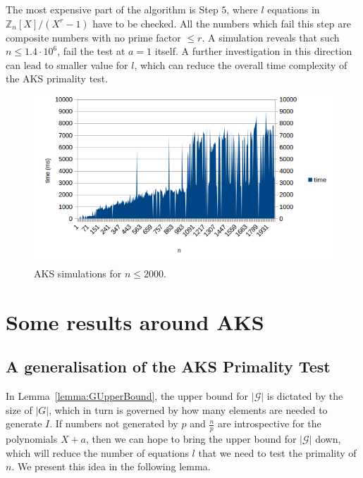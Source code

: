 \documentclass[11pt]{report}
\begin{document}
The most expensive part of the algorithm is Step $5$, where $l$ equations in $\mathbb{Z}_n[X]/(X^r-1)$ have to be checked. All the numbers which fail this step are composite numbers with no prime factor $\leq r$. A simulation reveals that such $n \leq 1.4 \cdot 10^6$, fail the test at $a = 1$ itself. A further investigation in this direction can lead to smaller value for $l$, which can reduce the overall time complexity of the AKS primality test.

\begin{figure}
  \includegraphics[width=\linewidth]{pictures/n-time-2000.png}
  \caption{AKS simulations for $n \leq 2000$.}
  \label{fig:aks_2000}
\end{figure}

\chapter{Some results around AKS}
\section{A generalisation of the AKS Primality Test}
In Lemma~\ref{lemma:GUpperBound}, the upper bound for $|\mathcal{G}|$ is dictated by the size of $|G|$, which in turn is governed by how many elements are needed to generate $I$. If numbers not generated by $p$ and $\frac{n}{p}$ are introspective for the polynomials $X+a$, then we can hope to bring the upper bound for $|\mathcal{G}|$ down, which will reduce the number of equations $l$ that we need to test the primality of $n$. We present this idea in the following lemma.
\end{document}
